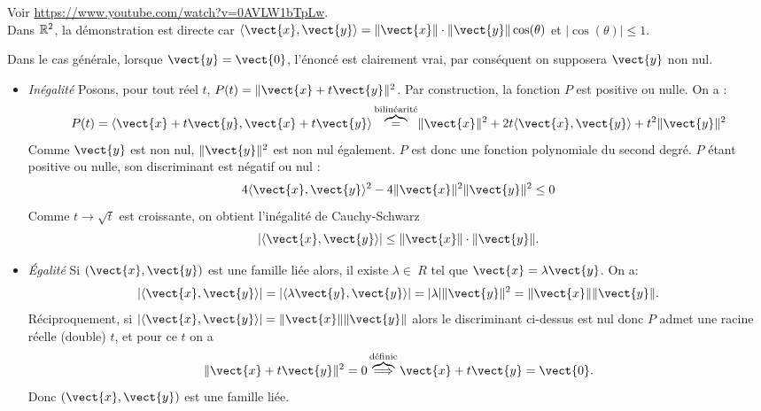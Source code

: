 \documentclass{book}
\begin{document}
\begin{Demonstration}
Voir \url{https://www.youtube.com/watch?v=0AVLW1bTpLw}.\\
Dans $\mathbb{R}^2$, la démonstration est directe car $\PS{\vect{x}}{\vect{y}}=\norme{\vect{x}}\cdot \norme{\vect{y}}\cos(\theta)$  et $|\cos(\theta)|\leq 1$.
\begin{center}
\end{center}
Dans le cas générale, lorsque $\vect{y} =  \vect{0}$, l'énoncé est clairement vrai, par conséquent on supposera $\vect{y}$ non nul.
\begin{itemize}
\item \textit{Inégalité} Posons, pour tout réel $t$, $P(t)=\norme{\vect{x}+t\vect{y}}^{2}$. Par construction, la fonction $P$ est  positive ou nulle. On a :
$$P(t)= \PS{\vect{x}+t\vect{y}}{\vect{x}+t\vect{y}}\overbrace{=}^{\text{bilinéarité}} \norme{\vect{x}}^2 +2t\PS{\vect{x}}{\vect{y}} +t^2  \norme{\vect{y}}^2$$
Comme $\vect{y}$ est non nul, $\norme{\vect{y}}^2$ est non nul également.  $P$ est donc une fonction polynomiale du second degré. $P$ étant positive ou nulle, son discriminant est négatif ou nul  :
$$4\PS{ \vect{x}}{\vect{y}}^{2}-4\norme{\vect{x}}^{2}\norme{\vect{y}}^{2}\leq 0 $$
Comme $t\to\sqrt{t}$ est croissante, on obtient l'inégalité de Cauchy-Schwarz
\[ | \PS{\vect{x}}{\vect{y}} | \leq  \norme{\vect{x}}\cdot \norme{\vect{y}}. \]
\item \textit{Égalité} Si $(\vect{x}, \vect{y})$ est une famille liée alors, il existe $\lambda\in\ R$ tel que $\vect{x} = \lambda\vect{y}$. On a:
$$|\PS{\vect{x}}{\vect{y}}|=|\PS{\lambda\vect{y}}{\vect{y}}|=|\lambda| \norme{\vect{y}}^{2}=\norme{\vect{x}}\norme{\vect{y}}.$$
Réciproquement, si $|\PS{\vect{x}}{\vect{y}}| = \norme{\vect{x}}\norme{\vect{y}}$ alors le discriminant ci-dessus est nul donc $P$ admet une racine réelle (double) $t$, et pour ce $t$ on a
$$ \norme{\vect{x}+t\vect{y}}^{2}=0\overbrace{\Longrightarrow}^{\text{définie}} \vect{x}+t\vect{y} =\vect{0}.$$
Donc $(\vect{x}, \vect{y})$ est une famille liée.
\end{itemize} 
\end{Demonstration}
\end{document}
